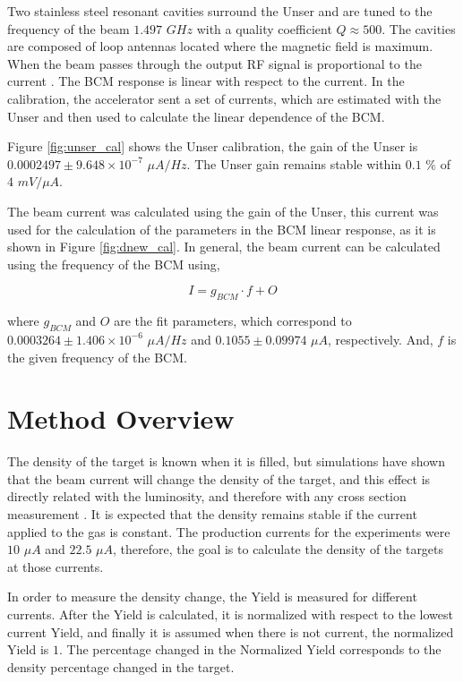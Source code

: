 \documentclass[preprint,12pt]{elsarticle}
\begin{document}
Two stainless steel resonant cavities surround the Unser and are tuned to the frequency of the beam $1.497$ $GHz$ with a quality coefficient $Q \approx 500$.    The cavities are composed of loop antennas located where the magnetic field is maximum. When the beam passes through the output RF signal is proportional to the current \cite{denard}. The BCM response is linear with respect to the current. In the calibration, the accelerator sent a set of currents, which are estimated with the Unser and then used to calculate the linear dependence of the BCM.


Figure \ref{fig:unser_cal} shows the Unser calibration, the gain of the Unser is $0.0002497 \pm 9.648 \times 10^{-7} $ $\mu A/Hz$. The Unser gain remains stable within $0.1$ $\%$ of $4$ $mV/\mu A$. 

The beam current was calculated using the gain of the Unser, this current was used for the calculation of the parameters in the BCM linear response, as it is shown in Figure \ref{fig:dnew_cal}. In general, the beam current can be calculated using the frequency of the BCM using,

\begin{equation}
I = g_{BCM}\cdot f+O
\label{eq:current_calc}
\end{equation}

\noindent where $g_{BCM}$ and $O$ are the fit parameters, which correspond to $0.0003264 \pm 1.406 \times 10^{-6}$ $\mu A/Hz$ and $0.1055 \pm 0.09974$  $\mu A$, respectively. And, $f$ is the given frequency of the BCM.

\section{Method Overview}

The density of the target is known when it is filled, but simulations have shown that the beam current will change the density of the target, and this effect is directly related with the luminosity, and therefore with any cross section measurement \cite{celldes}. It is expected that the density remains stable if the current applied to the gas is constant. The production currents for the experiments were $10$ $\mu A$ and $22.5$ $\mu A$, therefore, the goal is to calculate the density of the targets at those currents.  

In order to measure the density change, the Yield is measured for different currents. After the Yield is calculated, it is normalized with respect to the lowest current Yield, and finally it is assumed when there is not current, the normalized Yield is $1$. The percentage changed in the Normalized Yield corresponds to the density percentage changed in the target. 
\end{document}
